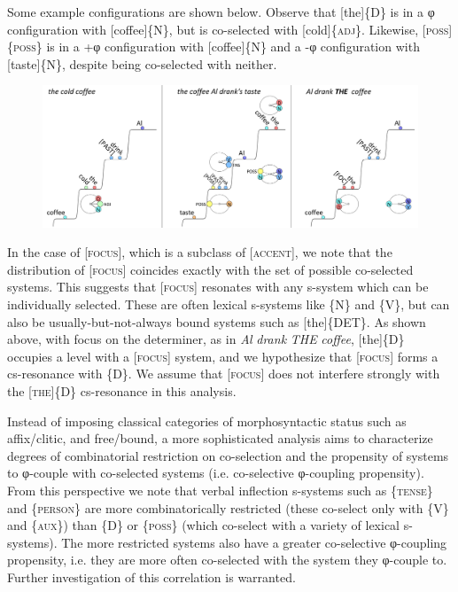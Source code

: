   Some example configurations are shown below. Observe that [the]\{\textsc{D}\} is in a φ configuration with [coffee]\{N\}, but is co-selected with [cold]\{\textsc{adj}\}. Likewise, [\textsc{poss}]\{\textsc{poss}\} is in a +φ configuration with [coffee]\{N\} and a -φ configuration with [taste]\{N\}, despite being co-selected with neither. 

  
\begin{figure}
\includegraphics[width=\textwidth]{figures/Tilsen-img68.png}
\caption{\missingcaption}
\label{fig:}
\end{figure}
 

  In the case of [\textsc{focus}], which is a subclass of [\textsc{accent}], we note that the distribution of [\textsc{focus}] coincides exactly with the set of possible co-selected systems. This suggests that [\textsc{focus}] resonates with any s-system which can be individually selected. These are often lexical s-systems like \{N\} and \{V\}, but can also be usually-but-not-always bound systems such as [the]\{DET\}. As shown above, with focus on the determiner, as in \textit{Al} \textit{drank} \textit{THE} \textit{coffee}, [the]\{D\} occupies a level with a [\textsc{focus}] system, and we hypothesize that [\textsc{focus}] forms a cs-resonance with \{D\}. We assume that [\textsc{focus}] does not interfere strongly with the [\textsc{the}]\{D\} cs-resonance in this analysis.

  Instead of imposing classical categories of morphosyntactic status such as affix/clitic, and free/bound, a more sophisticated analysis aims to characterize degrees of combinatorial restriction on co-selection and the propensity of systems to φ-couple with co-selected systems (i.e. co-selective φ-coupling propensity). From this perspective we note that verbal inflection s-systems such as \{\textsc{tense}\} and \{\textsc{person}\} are more combinatorically restricted (these co-select only with \{V\} and \{\textsc{aux}\}) than \{D\} or \{\textsc{poss}\} (which co-select with a variety of lexical s-systems). The more restricted systems also have a greater co-selective φ-coupling propensity, i.e. they are more often co-selected with the system they φ-couple to. Further investigation of this correlation is warranted.


